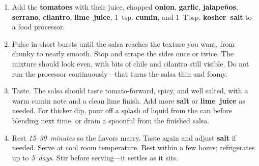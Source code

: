\documentclass[11pt,letterpaper]{article}
\begin{document}
\begin{enumerate}
    \item Add the \textbf{tomatoes} with their juice, chopped \textbf{onion}, \textbf{garlic}, \textbf{jalapeños}, \textbf{serrano}, \textbf{cilantro}, \textbf{lime~juice}, 1~tsp. \textbf{cumin}, and 1~Tbsp. \textbf{kosher~salt} to a food processor.

    \item Pulse in short bursts until the salsa reaches the texture you want, from chunky to nearly smooth. Stop and scrape the sides once or twice. The mixture should look even, with bits of chile and cilantro still visible. Do not run the processor continuously---that turns the salsa thin and foamy.

    \item Taste. The salsa should taste tomato-forward, spicy, and well salted, with a warm cumin note and a clean lime finish. Add more \textbf{salt} or \textbf{lime~juice} as needed. For thicker dip, pour off a splash of liquid from the can before blending next time, or drain a spoonful from the finished salsa.

    \item Rest \textit{15--30~minutes} so the flavors marry. Taste again and adjust \textbf{salt} if needed. Serve at cool room temperature. Best within a few hours; refrigerates up to \textit{5~days}. Stir before serving---it settles as it sits.
\end{enumerate}
\end{document}
